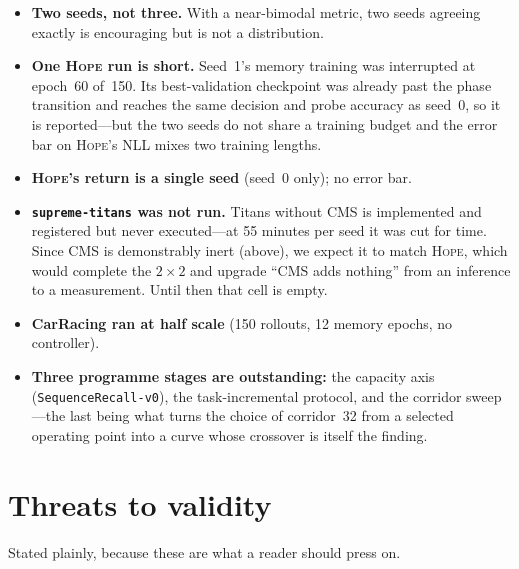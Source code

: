 \documentclass[11pt,a4paper]{article}
\newcommand{\code}[1]{\texttt{\small #1}}
\begin{document}
\begin{itemize}[leftmargin=*]
\item \textbf{Two seeds, not three.} With a near-bimodal metric, two seeds
agreeing exactly is encouraging but is not a distribution.
\item \textbf{One \textsc{Hope} run is short.} Seed~1's memory training was
interrupted at epoch~60 of~150. Its best-validation checkpoint was already past
the phase transition and reaches the same decision and probe accuracy as seed~0,
so it is reported---but the two seeds do not share a training budget and the
error bar on \textsc{Hope}'s NLL mixes two training lengths.
\item \textbf{\textsc{Hope}'s return is a single seed} (seed~0 only); no error bar.
\item \textbf{\code{supreme-titans} was not run.} Titans without CMS is
implemented and registered but never executed---at 55 minutes per seed it was cut
for time. Since CMS is demonstrably inert (above), we expect it to match
\textsc{Hope}, which would complete the $2\times2$ and upgrade ``CMS adds
nothing'' from an inference to a measurement. Until then that cell is empty.
\item \textbf{CarRacing ran at half scale} (150 rollouts, 12 memory epochs, no
controller).
\item \textbf{Three programme stages are outstanding:} the capacity axis
(\code{SequenceRecall-v0}), the task-incremental protocol, and the corridor
sweep---the last being what turns the choice of corridor~32 from a selected
operating point into a curve whose crossover is itself the finding.
\end{itemize}

\section{Threats to validity}

Stated plainly, because these are what a reader should press on.
\end{document}
